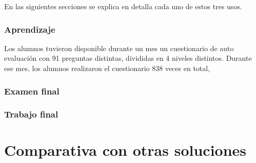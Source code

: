 En las siguientes secciones se explica en detalla cada uno de estos tres usos.

\subsubsection{Aprendizaje}

Los alumnos tuvieron disponible durante un mes un cuestionario de auto evaluación con 91 preguntas distintas, divididas en 4 niveles distintos.
Durante ese mes, los alumnos realizaron el cuestionario 838 veces en total, 

\subsubsection{Examen final}
\subsubsection{Trabajo final}

\section{Comparativa con otras soluciones}